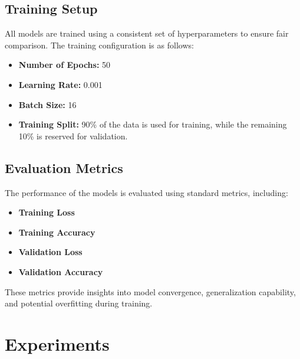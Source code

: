 \documentclass[12pt]{report}
\begin{document}
\section{Training Setup}

All models are trained using a consistent set of hyperparameters to ensure fair comparison. The training configuration is as follows:

\begin{itemize}
	\item \textbf{Number of Epochs:} 50
	\item \textbf{Learning Rate:} 0.001
	\item \textbf{Batch Size:} 16
	\item \textbf{Training Split:} 90\% of the data is used for training, while the remaining 10\% is reserved for validation.
\end{itemize}

\section{Evaluation Metrics}

The performance of the models is evaluated using standard metrics, including:

\begin{itemize}
	\item \textbf{Training Loss}
	\item \textbf{Training Accuracy}
	\item \textbf{Validation Loss}
	\item \textbf{Validation Accuracy}
\end{itemize}

These metrics provide insights into model convergence, generalization capability, and potential overfitting during training.

\chapter{Experiments}

\end{document}

